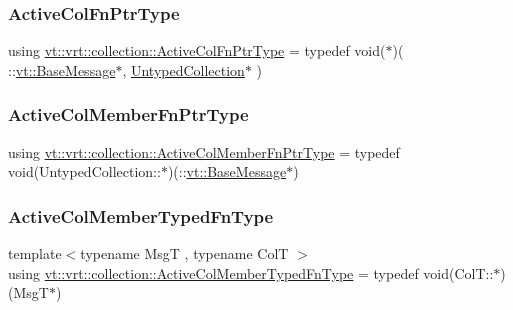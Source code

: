 \subsubsection{\texorpdfstring{Active\+Col\+Fn\+Ptr\+Type}{ActiveColFnPtrType}}
{\footnotesize\ttfamily using \hyperlink{namespacevt_1_1vrt_1_1collection_ab2e800e37837a2afe33996fe8f5fabea}{vt\+::vrt\+::collection\+::\+Active\+Col\+Fn\+Ptr\+Type} = typedef void($\ast$)( \+::\hyperlink{namespacevt_ac34f95a5e2b8109b55bfba52b074443d}{vt\+::\+Base\+Message}$\ast$, \hyperlink{structvt_1_1vrt_1_1collection_1_1_untyped_collection}{Untyped\+Collection}$\ast$ )}

\mbox{\label{namespacevt_1_1vrt_1_1collection_aa4614a0de67301c62259b0763a86f473}} 
\subsubsection{\texorpdfstring{Active\+Col\+Member\+Fn\+Ptr\+Type}{ActiveColMemberFnPtrType}}
{\footnotesize\ttfamily using \hyperlink{namespacevt_1_1vrt_1_1collection_aa4614a0de67301c62259b0763a86f473}{vt\+::vrt\+::collection\+::\+Active\+Col\+Member\+Fn\+Ptr\+Type} = typedef void(Untyped\+Collection\+::$\ast$)(\+::\hyperlink{namespacevt_ac34f95a5e2b8109b55bfba52b074443d}{vt\+::\+Base\+Message}$\ast$)}

\mbox{\label{namespacevt_1_1vrt_1_1collection_a87925616c03cf4ccc548d33b2fe172ee}} 
\subsubsection{\texorpdfstring{Active\+Col\+Member\+Typed\+Fn\+Type}{ActiveColMemberTypedFnType}}
{\footnotesize\ttfamily template$<$typename MsgT , typename ColT $>$ \\
using \hyperlink{namespacevt_1_1vrt_1_1collection_a87925616c03cf4ccc548d33b2fe172ee}{vt\+::vrt\+::collection\+::\+Active\+Col\+Member\+Typed\+Fn\+Type} = typedef void(Col\+T\+::$\ast$)(MsgT$\ast$)}

